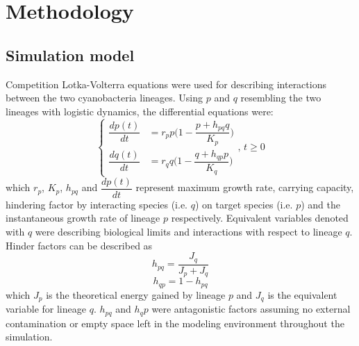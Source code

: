\documentclass[../thesis.tex]{subfiles} %
\begin{document}
\section{Methodology}
\subsection{Simulation model}
Competition Lotka-Volterra equations were used for describing interactions between the two cyanobacteria lineages.  Using $p$ and $q$ resembling the two lineages with logistic dynamics, the differential equations were:
\begin{equation}
    \left\{\begin{array}{rl}
        \dfrac{dp(t)}{dt} &= r_pp\Big(1-\dfrac{p+h_{pq}q}{K_p}\Big)\\
        \dfrac{dq(t)}{dt} &= r_qq\Big(1-\dfrac{q+h_{qp}p}{K_q}\Big)
    \end{array}\right.\text{, }t\geq0
    \label{eq:main}
\end{equation}
which $r_p$, $K_p$, $h_{pq}$ and $\dfrac{dp(t)}{dt}$ represent maximum growth rate, carrying capacity, hindering factor by interacting species (i.e. $q$) on target species (i.e. $p$) and the instantaneous growth rate of lineage $p$ respectively.  Equivalent variables denoted with $q$ were describing biological limits and interactions with respect to lineage $q$.  Hinder factors can be described as
\begin{equation}
    h_{pq} = \dfrac{J_q}{J_p+J_q}
    \label{eq:hinder1}
\end{equation}
\begin{equation}
    h_{qp} = 1-h_{pq}
    \label{eq:hinder2}
\end{equation}
which $J_p$ is the theoretical energy gained by lineage $p$ and $J_q$ is the equivalent variable for lineage $q$.  $h_{pq}$ and $h_qp$ were antagonistic factors assuming no external contamination or empty space left in the modeling environment throughout the simulation.
\end{document}
